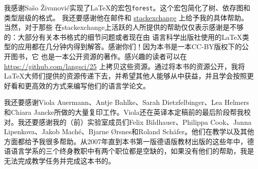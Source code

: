 我感谢Sašo Živanović实现了\LaTeX{}的宏包\texttt{forest}。这个宏包简化了树、依存图和类型层级的格式。
我还要感谢他在邮件和 \href{http://www.stackexchange.com}{stackexchange} 上给予我的具体帮助。当然，对于那些
在stackexchange上活跃的人所提供的帮助仅仅表示感谢是不够的：大部分有关本书格式的细节问题或者现在由
语言科学出版社使用的\LaTeX{}类型的应用都在几分钟内得到解答。感谢你们！因为本书是一本CC-BY版权下的公开图书，它
也是一本公开资源的著作。感兴趣的读者可以在 \url{https://github.com/langsci/25} 上拷贝这些资源。通过将本书的资源公开，我将\LaTeX{}大师们提供的资源传递下去，并希望其他人能够从中获益，并且学会按照更好看和更高效的方式来编写他们的语言学论文。

\largerpage
我还要感谢Viola Auermann、Antje Bahlke、Sarah Dietzfelbinger、Lea Helmers和Chiara Jancke所做的大量复印工作。Viola还在英译本定稿前的最后阶段帮我校对。我还要感谢我的（前）实验室成员们Felix Bildhauer、Philippa Cook、Janna Lipenkova、Jakob Maché、Bjarne Ørsnes和Roland Schäfer。他们在教学以及其他方面都给予我很多帮助。从2007年直到本书第一版德语版教材出版的这些年中，德语语言学系的三个终身教职中有两个职位都是空缺的，如果没有他们的帮助，我是无法完成教学任务并完成这本书的。


